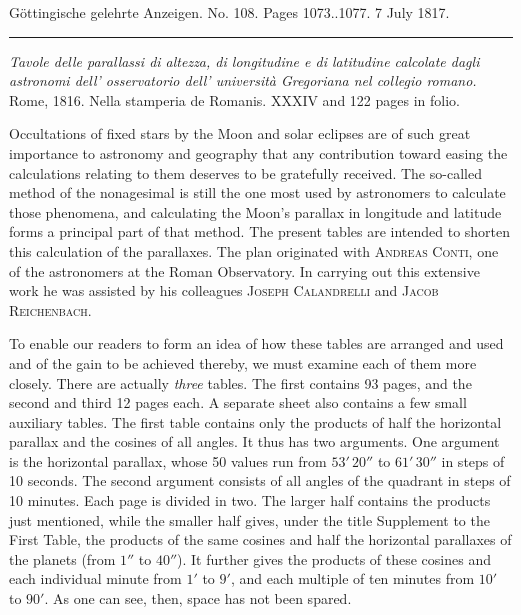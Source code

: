 \clearpage
{}
\hypertarget{native-604-lower}{}
\begin{center}\small Göttingische gelehrte Anzeigen. No. 108. Pages 1073..1077. 7 July 1817.\\[3pt]\rule{.72\linewidth}{.3pt}\end{center}

\emph{Tavole delle parallassi di altezza, di longitudine e di latitudine calcolate dagli astronomi dell' osservatorio dell' università Gregoriana nel collegio romano.} Rome, 1816. Nella stamperia de Romanis. XXXIV and 122 pages in folio.

\begingroup{}\relax
Occultations of fixed stars by the Moon and solar eclipses are of such great importance to astronomy and geography that any contribution toward easing the calculations relating to them deserves to be gratefully received. The so-called method of the nonagesimal is still the one most used by astronomers to calculate those phenomena, and calculating the Moon's parallax in longitude and latitude forms a principal part of that method. The present tables are intended to shorten this calculation of the parallaxes. The plan originated with \textsc{Andreas Conti}, one of the astronomers at the Roman Observatory. In carrying out this extensive work he was assisted by his colleagues \textsc{Joseph Calandrelli} and \textsc{Jacob Reichenbach}.

To enable our readers to form an idea of how these tables are arranged and used and of the gain to be achieved thereby, we must examine each of them more closely. There are actually \emph{three} tables. The first contains 93 pages, and the second and third 12 pages each. A separate sheet also contains a few small auxiliary tables. The first table contains only the products of half the horizontal parallax and the cosines of all angles. It thus has two arguments. One argument is the horizontal parallax, whose 50 values run from $53'\,20''$ to $61'\,30''$ in steps of 10 seconds. The second argument consists of all angles of the quadrant in steps of 10 minutes. Each page is divided in two. The larger half contains the products just mentioned, while the smaller half gives, under the title Supplement to the First Table, the products of the same cosines and half the horizontal parallaxes of the planets (from $1''$ to $40''$). It further gives the products of these cosines and each individual minute from $1'$ to $9'$, and each multiple of ten minutes from $10'$ to $90'$. As one can see, then, space has not been spared.

